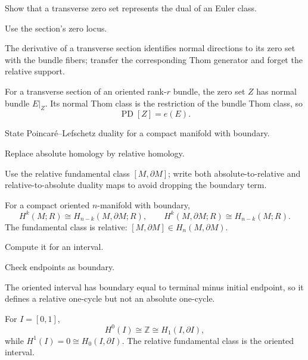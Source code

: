 \begin{exercise}\label{exr:viii33-15}
Show that a transverse zero set represents the dual of an Euler class.
\end{exercise}
\begin{hint}
Use the section's zero locus.

The derivative of a transverse section identifies normal directions to its zero set with the bundle fibers; transfer the corresponding Thom generator and forget the relative support.
\end{hint}
\begin{solution}
For a transverse section of an oriented rank-\(r\) bundle, the zero set \(Z\) has normal bundle \(E|_Z\). Its normal Thom class is the restriction of the bundle Thom class, so
\[
\operatorname{PD}[Z]=e(E).
\]
\end{solution}

\begin{exercise}\label{exr:viii33-16}
State Poincaré--Lefschetz duality for a compact manifold with boundary.
\end{exercise}
\begin{hint}
Replace absolute homology by relative homology.

Use the relative fundamental class \([M,\partial M]\); write both absolute-to-relative and relative-to-absolute duality maps to avoid dropping the boundary term.
\end{hint}
\begin{solution}
For a compact oriented \(n\)-manifold with boundary,
\[
H^k(M;R)\cong H_{n-k}(M,\partial M;R),
\qquad
H^k(M,\partial M;R)\cong H_{n-k}(M;R).
\]
The fundamental class is relative: \([M,\partial M]\in H_n(M,\partial M)\).
\end{solution}

\begin{exercise}\label{exr:viii33-17}
Compute it for an interval.
\end{exercise}
\begin{hint}
Check endpoints as boundary.

The oriented interval has boundary equal to terminal minus initial endpoint, so it defines a relative one-cycle but not an absolute one-cycle.
\end{hint}
\begin{solution}
For \(I=[0,1]\),
\[
H^0(I)\cong\mathbb Z\cong H_1(I,\partial I),
\]
while \(H^1(I)=0\cong H_0(I,\partial I)\). The relative fundamental class is the oriented interval.
\end{solution}

